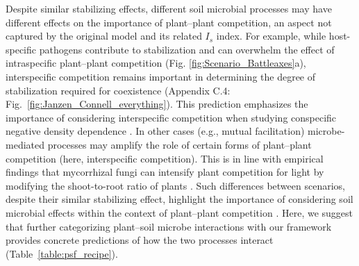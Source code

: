 Despite similar stabilizing effects, different soil microbial processes may have different effects on the importance of plant--plant competition, an aspect not captured by the original \citet{Bever1997} model and its related $I_{s}$ index.
For example, while host-specific pathogens contribute to stabilization and can overwhelm the effect of intraspecific plant--plant competition (Fig. \ref{fig:Scenario_Battleaxes}a), interspecific competition remains important in determining the degree of stabilization required for coexistence (Appendix C.4: Fig.~\ref{fig:Janzen_Connell_everything}). This prediction emphasizes the importance of considering interspecific competition when studying conspecific negative density dependence \citep{LaManna2017}.
In other cases (e.g., mutual facilitation) microbe-mediated processes may amplify the role of certain forms of plant--plant competition (here, interspecific competition). This is in line with empirical findings that mycorrhizal fungi can intensify plant competition for light \citep{Facelli1999} by modifying the shoot-to-root ratio of plants \citep{Veresoglou2012}.
Such differences between scenarios, despite their similar stabilizing effect, highlight the importance of considering soil microbial effects within the context of plant--plant competition \citep{Callaway2004, Casper2007, Shannon2012, Crawford2017, Peay2018}.
Here, we suggest that further categorizing plant--soil microbe interactions with our framework provides concrete predictions of how the two processes interact (Table~\ref{table:psf_recipe}).
\par



